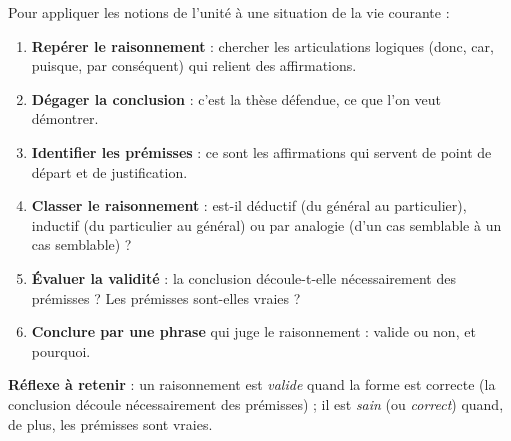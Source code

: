 \documentclass[11pt]{article}
\newcommand{\cle}[1]{{\popxbold\color{popdark}#1}}
\begin{document}
\begin{methode}
Pour appliquer les notions de l'unité à une situation de la vie courante :
\begin{enumerate}
\item \textbf{Repérer le raisonnement} : chercher les articulations logiques (donc, car, puisque, par conséquent) qui relient des affirmations.
\item \textbf{Dégager la conclusion} : c'est la thèse défendue, ce que l'on veut démontrer.
\item \textbf{Identifier les prémisses} : ce sont les affirmations qui servent de point de départ et de justification.
\item \textbf{Classer le raisonnement} : est-il \cle{déductif} (du général au particulier), \cle{inductif} (du particulier au général) ou par \cle{analogie} (d'un cas semblable à un cas semblable) ?
\item \textbf{Évaluer la validité} : la conclusion découle-t-elle nécessairement des prémisses ? Les prémisses sont-elles vraies ?
\item \textbf{Conclure par une phrase} qui juge le raisonnement : valide ou non, et pourquoi.
\end{enumerate}
\textbf{Réflexe à retenir} : un raisonnement est \emph{valide} quand la forme est correcte (la conclusion découle nécessairement des prémisses) ; il est \emph{sain} (ou \emph{correct}) quand, de plus, les prémisses sont vraies.
\end{methode}
\end{document}
